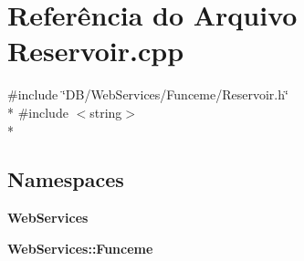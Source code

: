 \section{Referência do Arquivo Reservoir.\+cpp}
\label{_reservoir_8cpp}
{\ttfamily \#include \char`\"{}D\+B/\+Web\+Services/\+Funceme/\+Reservoir.\+h\char`\"{}}\\*
{\ttfamily \#include $<$string$>$}\\*
\subsection*{Namespaces}
\begin{DoxyCompactItemize}
\item 
 {\bf Web\+Services}
\item 
 {\bf Web\+Services\+::\+Funceme}
\end{DoxyCompactItemize}
